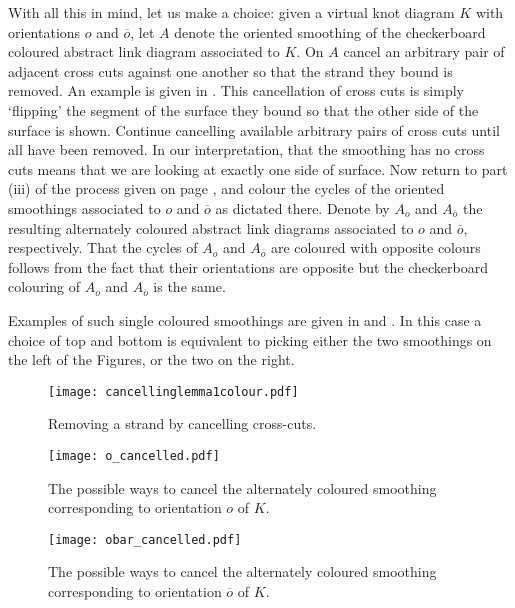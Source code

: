 \documentclass[10pt,oneside]{amsart}
\theoremstyle{definition}
\numberwithin{equation}{section}
\begin{document}
With all this in mind, let us make a choice: given a virtual knot diagram \( K \) with orientations \( o \) and \( \overline{o} \), let \( A \) denote the oriented smoothing of the checkerboard coloured abstract link diagram associated to \( K \). On \( A \) cancel an arbitrary pair of adjacent cross cuts against one another so that the strand they bound is removed. An example is given in . This cancellation of cross cuts is simply `flipping' the segment of the surface they bound so that the other side of the surface is shown. Continue cancelling available arbitrary pairs of cross cuts until all have been removed. In our interpretation, that the smoothing has no cross cuts means that we are looking at exactly one side of surface. Now return to part (iii) of the process given on page \pageref{part3}, and colour the cycles of the oriented smoothings associated to \( o \) and \( \overline{o} \) as dictated there. Denote by \( A_o \) and \( A_{\overline{o}} \) the resulting alternately coloured abstract link diagrams associated to \( o \) and \( \overline{o} \), respectively. That the cycles of \( A_o \) and \( A_{\overline{o}} \) are coloured with opposite colours follows from the fact that their orientations are opposite but the checkerboard colouring of \( A_o \) and \( A_{\overline{o}} \) is the same.

Examples of such single coloured smoothings are given in  and . In this case a choice of top and bottom is equivalent to picking either the two smoothings on the left of the Figures, or the two on the right.

\begin{figure}
	\texttt{[image: cancellinglemma1colour.pdf]}
	\caption{Removing a strand by cancelling cross-cuts.}
	\label{Fig:cancellation}
\end{figure}

\begin{figure}
	\texttt{[image: o\_cancelled.pdf]}
	\caption{The possible ways to cancel the alternately coloured smoothing corresponding to orientation \( o \) of \( K \).}
	\label{Fig:cancelledo}
\end{figure}
\begin{figure}
	\texttt{[image: obar\_cancelled.pdf]}
	\caption{The possible ways to cancel the alternately coloured smoothing corresponding to orientation \( \overline{o} \) of \( K \).}
	\label{Fig:cancelledobar}
\end{figure}
\end{document}
